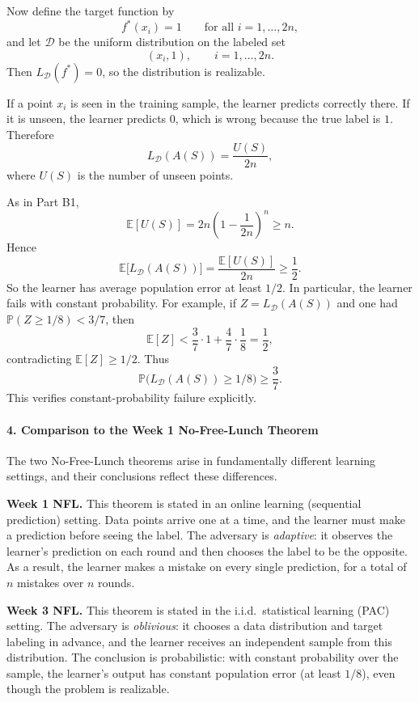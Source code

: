 \documentclass[11pt]{article}
\newcommand{\E}{\mathbb{E}}
\newcommand{\Pbb}{\mathbb{P}}
\begin{document}
\begin{solutionbox}
Now define the target function by
\[
f^*(x_i)=1 \qquad \text{for all } i=1,\dots,2n,
\]
and let $\mathcal D$ be the uniform distribution on the labeled set
\[
(x_i,1), \qquad i=1,\dots,2n.
\]
Then $L_{\mathcal D}(f^*)=0$, so the distribution is realizable.

If a point $x_i$ is seen in the training sample, the learner predicts correctly there. If it is unseen, the learner predicts $0$, which is wrong because the true label is $1$. Therefore
\[
L_{\mathcal D}(A(S)) = \frac{U(S)}{2n},
\]
where $U(S)$ is the number of unseen points.

As in Part B1,
\[
\E[U(S)] = 2n\left(1-\frac1{2n}\right)^n \ge n.
\]
Hence
\[
\E\bigl[L_{\mathcal D}(A(S))\bigr]
=
\frac{\E[U(S)]}{2n}
\ge
\frac12.
\]
So the learner has average population error at least $1/2$. In particular, the learner fails with constant probability. For example, if $Z=L_{\mathcal D}(A(S))$ and one had $\Pbb(Z\ge 1/8)<3/7$, then
\[
\E[Z]
<
\frac37\cdot 1 + \frac47\cdot \frac18
=
\frac12,
\]
contradicting $\E[Z]\ge 1/2$. Thus
\[
\Pbb\bigl(L_{\mathcal D}(A(S))\ge 1/8\bigr)\ge \frac37.
\]
This verifies constant-probability failure explicitly.
\medskip

\paragraph{4. Comparison to the Week 1 No-Free-Lunch Theorem}

The two No-Free-Lunch theorems arise in fundamentally different learning settings, and their conclusions reflect these differences.

\medskip

\textbf{Week 1 NFL.}
This theorem is stated in an online learning (sequential prediction) setting. Data points arrive one at a time, and the learner must make a prediction before seeing the label. The adversary is \emph{adaptive}: it observes the learner’s prediction on each round and then chooses the label to be the opposite. As a result, the learner makes a mistake on every single prediction, for a total of $n$ mistakes over $n$ rounds.

\medskip

\textbf{Week 3 NFL.}
This theorem is stated in the i.i.d.\ statistical learning (PAC) setting. The adversary is \emph{oblivious}: it chooses a data distribution and target labeling in advance, and the learner receives an independent sample from this distribution. The conclusion is probabilistic: with constant probability over the sample, the learner’s output has constant population error (at least $1/8$), even though the problem is realizable.


\end{solutionbox}
\end{document}
